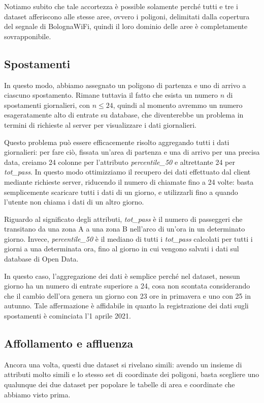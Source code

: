 Notiamo subito che tale accortezza è possible solamente perché tutti e tre i dataset afferiscono alle stesse aree, ovvero i poligoni, delimitati dalla copertura del segnale di BolognaWiFi, quindi il loro dominio delle aree è completamente sovrapponibile.

\subsection{Spostamenti}
In questo modo, abbiamo assegnato un poligono di partenza e uno di arrivo a ciascuno spostamento. Rimane tuttavia il fatto che esista un numero \( n \) di spostamenti giornalieri, con \( n \leq 24 \), quindi al momento avremmo un numero esageratamente alto di entrate su database, che diventerebbe un problema in termini di richieste al server per visualizzare i dati giornalieri.

Questo problema può essere efficacemente risolto aggregando tutti i dati giornalieri: per fare ciò, fissata un'area di partenza e una di arrivo per una precisa data, creiamo 24 colonne per l'attributo \textit{percentile\_50} e altrettante 24 per \textit{tot\_pass}. In questo modo ottimizziamo il recupero dei dati effettuato dal client mediante richieste server, riducendo il numero di chiamate fino a 24 volte: basta semplicemente scaricare tutti i dati di un giorno, e utilizzarli fino a quando l'utente non chiama i dati di un altro giorno.

Riguardo al significato degli attributi, \textit{tot\_pass} è il numero di passeggeri che transitano da una zona A a una zona B nell'arco di un'ora in un determinato giorno. Invece, \textit{percentile\_50} è il mediano di tutti i \textit{tot\_pass} calcolati per tutti i giorni a una determinata ora, fino al giorno in cui vengono salvati i dati sul database di Open Data.

In questo caso, l'aggregazione dei dati è semplice perché nel dataset, nessun giorno ha un numero di entrate superiore a 24, cosa non scontata considerando che il cambio dell'ora genera un giorno con 23 ore in primavera e uno con 25 in autunno. Tale affermazione è affidabile in quanto la registrazione dei dati sugli spostamenti è cominciata l'1 aprile 2021.

\subsection{Affollamento e affluenza}
Ancora una volta, questi due dataset si rivelano simili: avendo un insieme di attributi molto simili e lo stesso set di coordinate dei poligoni, basta scegliere uno qualunque dei due dataset per popolare le tabelle di area e coordinate che abbiamo visto prima.

